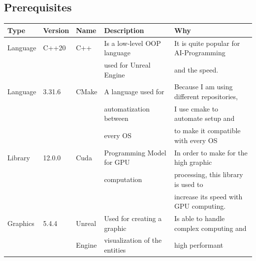 \documentclass[10pt, letterpaper]{article}
\begin{document}
\begin{Form}
	\section{Prerequisites}

	\begin{center}
		\begin{tabular}{|l|l|l|l|l|}
			\hline
			Type     & Version & Name   & Description                   & Why                                        \\

			\hline
			Language & C++20   & C++    & Is a low-level OOP language   & It is quite popular for AI-Programming     \\
			         &         &        & used for Unreal Engine        & and the speed.                             \\

			\hline
			Language & 3.31.6  & CMake  & A language used for           & Because I am using different repositories, \\
			         &         &        & automatization between        & I use cmake to automate setup and          \\
			         &         &        & every OS                      & to make it compatible with every OS        \\

			\hline
			Library  & 12.0.0  & Cuda   & Programming Model for GPU     & In order to make for the high graphic      \\
			         &         &        & computation                   & processing, this library is used to        \\
			         &         &        &                               & increase its speed with GPU computing.     \\
			\hline
			Graphics & 5.4.4   & Unreal & Used for creating a graphic   & Is able to handle complex computing and    \\
			         &         & Engine & visualization of the entities & high performant                            \\

			\hline
		\end{tabular}
	\end{center}


\end{Form}
\end{document}
